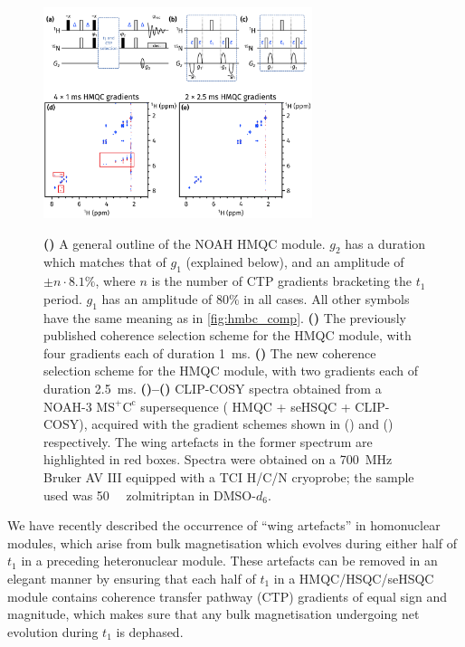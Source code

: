 \documentclass[a4paper,11pt]{article}
\newcommand{\carbon}{\ce{^{13}C}}
\newcommand{\nitrogen}{\ce{^{15}N}}
\newcommand*{\zolmi}{Spectra were obtained on a \SI{700}{\MHz} Bruker AV III equipped with a TCI H/C/N cryoprobe; the sample used was \SI{50}{\milli\molar} zolmitriptan in DMSO-$d_6$.}
\begin{document}
\begin{figure}[ht]
    \centering
    \includegraphics[width=0.7\textwidth]{hmqc_comp.png}
    {\label{fig:hmqc_comp_pulprog}}
    {\label{fig:hmqc_comp_pulprog_before}}
    {\label{fig:hmqc_comp_pulprog_after}}
    {\label{fig:hmqc_comp_spec_before}}
    {\label{fig:hmqc_comp_spec_after}}
    \caption{
        \textbf{()} A general outline of the NOAH \nitrogen{} HMQC module.
        $g_2$ has a duration which matches that of $g_1$ (explained below), and an amplitude of $\pm n \cdot 8.1\%$, where $n$ is the number of CTP gradients bracketing the $t_1$ period.
        $g_1$ has an amplitude of $80\%$ in all cases.
        All other symbols have the same meaning as in \cref{fig:hmbc_comp}.
        \textbf{()} The previously published coherence selection scheme for the HMQC module, with four gradients each of duration \SI{1}{ms}.
        \textbf{()} The new coherence selection scheme for the HMQC module, with two gradients each of duration \SI{2.5}{ms}.
        \textbf{()--()} CLIP-COSY spectra obtained from a NOAH-3 $\mathrm{MS^+C^c}$ supersequence (\nitrogen{} HMQC + \carbon{} seHSQC + CLIP-COSY), acquired with the gradient schemes shown in () and () respectively.
        The wing artefacts in the former spectrum are highlighted in red boxes.
        \zolmi{}
    }
    \label{fig:hmqc_comp}
\end{figure}

We have recently described the occurrence of ``wing artefacts'' in homonuclear modules, which arise from bulk magnetisation which evolves during either half of $t_1$ in a preceding heteronuclear module.\autocite{Yong2021JMR}
These artefacts can be removed in an elegant manner by ensuring that each half of $t_1$ in a HMQC/HSQC/seHSQC module contains coherence transfer pathway (CTP) gradients of equal sign and magnitude, which makes sure that any bulk magnetisation undergoing net evolution during $t_1$ is dephased.
\end{document}
